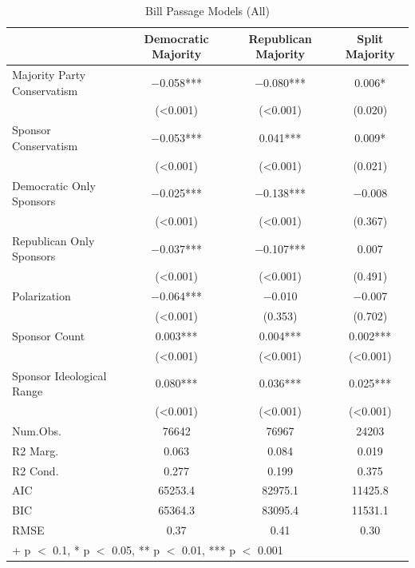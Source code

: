 \documentclass[
  oneside]{book}
\begin{document}
\begin{table}

\caption{\label{tab:billmodel}Bill Passage Models (All)}
\centering
\begin{tabular}[t]{lccc}
\toprule
  & Democratic Majority & Republican Majority & Split Majority\\
\midrule
Majority Party Conservatism & \num{-0.058}*** & \num{-0.080}*** & \num{0.006}*\\
 & (\num{<0.001}) & (\num{<0.001}) & (\num{0.020})\\
Sponsor Conservatism & \num{-0.053}*** & \num{0.041}*** & \num{0.009}*\\
 & (\num{<0.001}) & (\num{<0.001}) & (\num{0.021})\\
Democratic Only Sponsors & \num{-0.025}*** & \num{-0.138}*** & \num{-0.008}\\
 & (\num{<0.001}) & (\num{<0.001}) & (\num{0.367})\\
Republican Only Sponsors & \num{-0.037}*** & \num{-0.107}*** & \num{0.007}\\
 & (\num{<0.001}) & (\num{<0.001}) & (\num{0.491})\\
Polarization & \num{-0.064}*** & \num{-0.010} & \num{-0.007}\\
 & (\num{<0.001}) & (\num{0.353}) & (\num{0.702})\\
Sponsor Count & \num{0.003}*** & \num{0.004}*** & \num{0.002}***\\
 & (\num{<0.001}) & (\num{<0.001}) & \vphantom{1} (\num{<0.001})\\
Sponsor Ideological Range & \num{0.080}*** & \num{0.036}*** & \num{0.025}***\\
 & (\num{<0.001}) & (\num{<0.001}) & (\num{<0.001})\\
\midrule
Num.Obs. & \num{76642} & \num{76967} & \num{24203}\\
R2 Marg. & \num{0.063} & \num{0.084} & \num{0.019}\\
R2 Cond. & \num{0.277} & \num{0.199} & \num{0.375}\\
AIC & \num{65253.4} & \num{82975.1} & \num{11425.8}\\
BIC & \num{65364.3} & \num{83095.4} & \num{11531.1}\\
RMSE & \num{0.37} & \num{0.41} & \num{0.30}\\
\bottomrule
\multicolumn{4}{l}{\rule{0pt}{1em}+ p $<$ 0.1, * p $<$ 0.05, ** p $<$ 0.01, *** p $<$ 0.001}\\
\end{tabular}
\end{table}
\end{document}
